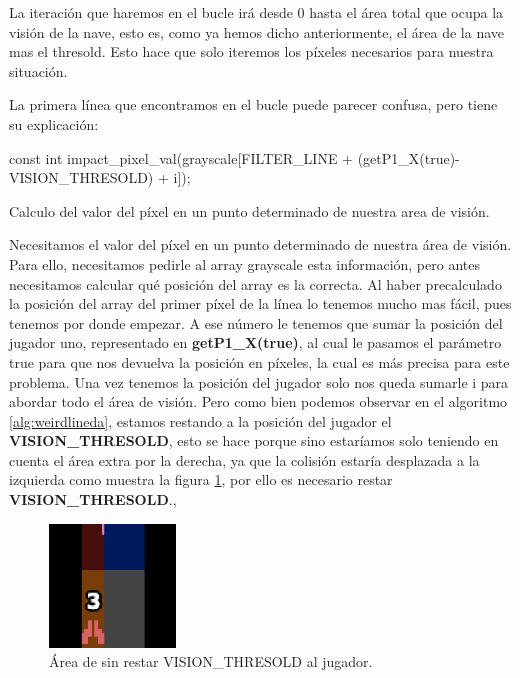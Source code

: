 La iteración que haremos en el bucle irá desde 0 hasta el área total que ocupa la visión de la nave, esto es, como ya hemos dicho anteriormente, el área de la nave mas el thresold. Esto hace que solo iteremos los píxeles necesarios para nuestra situación.

La primera línea que encontramos en el bucle puede parecer confusa, pero tiene su explicación:

\vspace{2mm}
\begin{algorithm}[H]
    const int impact\_pixel\_val(grayscale[FILTER\_LINE + (getP1\_X(true)-VISION\_THRESOLD) + i]);
	\caption{Calculo del valor del píxel en un punto determinado de nuestra area de visión.}
	\label{alg:weirdlineda}
\end{algorithm}
\vspace{2mm}

Necesitamos el valor del píxel en un punto determinado de nuestra área de visión. Para ello, necesitamos pedirle al array grayscale esta información, pero antes necesitamos calcular qué posición del array es la correcta. Al haber precalculado la posición del array del primer píxel de la línea lo tenemos mucho mas fácil, pues tenemos por donde empezar. A ese número le tenemos que sumar la posición del jugador uno, representado en \textbf{getP1\_X(true)}, al cual le pasamos el parámetro true para que nos devuelva la posición en píxeles, la cual es más precisa para este problema. Una vez tenemos la posición del jugador solo nos queda sumarle i para abordar todo el área de visión. Pero como bien podemos observar en el algoritmo \ref{alg:weirdlineda}, estamos restando a la posición del jugador el \textbf{VISION\_THRESOLD}, esto se hace porque sino estaríamos solo teniendo en cuenta el área extra por la derecha, ya que la colisión estaría desplazada a la izquierda como muestra la figura 	\ref{fig:colisioncalculadaerroneamenteda}, por ello es necesario restar \textbf{VISION\_THRESOLD}.,

\begin{figure}[h]
	\centering
	\includegraphics[width=0.3\textwidth]{Figures/colisioncalculadaerroneamenteda}
	\caption{Área de sin restar VISION\_THRESOLD al jugador.}
	\label{fig:colisioncalculadaerroneamenteda}
\end{figure}

